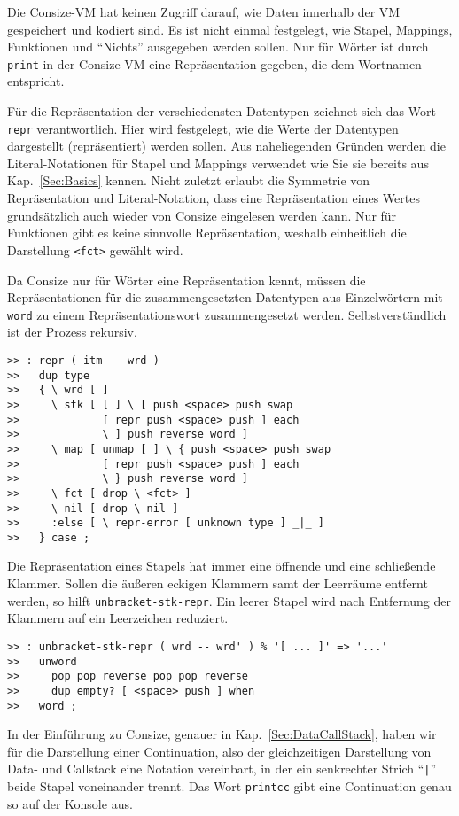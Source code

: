 Die Consize-VM hat keinen Zugriff darauf, wie Daten innerhalb der VM gespeichert und kodiert sind. Es ist nicht einmal festgelegt, wie Stapel, Mappings, Funktionen und "`Nichts"' ausgegeben werden sollen. Nur für Wörter ist durch \verb|print| in der Consize-VM eine Repräsentation gegeben, die dem Wortnamen entspricht.

Für die Repräsentation der verschiedensten Datentypen zeichnet sich das Wort \verb|repr| verantwortlich. Hier wird festgelegt, wie die Werte der Datentypen dargestellt (repräsentiert) werden sollen. Aus naheliegenden Gründen werden die Literal-Notationen für Stapel und Mappings verwendet wie Sie sie bereits aus Kap.~\ref{Sec:Basics} kennen. Nicht zuletzt erlaubt die Symmetrie von Repräsentation und Literal-Notation, dass eine Repräsentation eines Wertes grundsätzlich auch wieder von Consize eingelesen werden kann. Nur für Funktionen gibt es keine sinnvolle Repräsentation, weshalb einheitlich die Darstellung \verb|<fct>| gewählt wird.

Da Consize nur für Wörter eine Repräsentation kennt, müssen die Repräsentationen für die zusammengesetzten Datentypen aus Einzelwörtern mit \verb|word| zu einem Repräsentationswort zusammengesetzt werden. Selbstverständlich ist der Prozess rekursiv.

\begin{verbatim}
>> : repr ( itm -- wrd ) 
>>   dup type
>>   { \ wrd [ ]
>>     \ stk [ [ ] \ [ push <space> push swap 
>>             [ repr push <space> push ] each
>>             \ ] push reverse word ]
>>     \ map [ unmap [ ] \ { push <space> push swap
>>             [ repr push <space> push ] each
>>             \ } push reverse word ]
>>     \ fct [ drop \ <fct> ]
>>     \ nil [ drop \ nil ]
>>     :else [ \ repr-error [ unknown type ] _|_ ]
>>   } case ;
\end{verbatim}

Die Repräsentation eines Stapels hat immer eine öffnende und eine schließende Klammer. Sollen die äußeren eckigen Klammern samt der Leer\-räu\-me entfernt werden, so hilft \verb|unbracket-stk-repr|. Ein leerer Stapel wird nach Entfernung der Klammern auf ein Leerzeichen reduziert.

\begin{verbatim}
>> : unbracket-stk-repr ( wrd -- wrd' ) % '[ ... ]' => '...'
>>   unword
>>     pop pop reverse pop pop reverse
>>     dup empty? [ <space> push ] when
>>   word ;
\end{verbatim}

In der Einführung zu Consize, genauer in Kap.~\ref{Sec:DataCallStack}, haben wir für die Darstellung einer Continuation, also der gleichzeitigen Darstellung von Data- und Callstack eine Notation vereinbart, in der ein senkrechter Strich "`\verb!|!"' beide Stapel voneinander trennt. Das Wort \verb|printcc| gibt eine Continuation genau so auf der Konsole aus.

